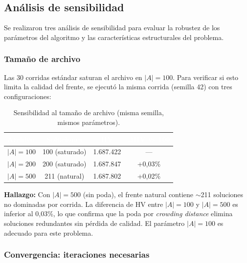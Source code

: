 \documentclass[12pt,letterpaper]{article}
\begin{document}
\subsection{Análisis de sensibilidad}

Se realizaron tres análisis de sensibilidad para evaluar la robustez de los parámetros del algoritmo y las características estructurales del problema.

\subsubsection{Tamaño de archivo}

Las 30 corridas estándar saturan el archivo en $|A| = 100$. Para verificar si esto limita la calidad del frente, se ejecutó la misma corrida (semilla 42) con tres configuraciones:

\begin{table}[H]
\centering
\caption{Sensibilidad al tamaño de archivo (misma semilla, mismos parámetros).}
\label{tab:archive_sens}
\renewcommand{\arraystretch}{1.4}
\begin{tabular}{lccc}
\toprule
\rowcolor{tablehead}
\textcolor{white}{\textbf{Archivo}} & \textcolor{white}{\textbf{Soluciones}} & \textcolor{white}{\textbf{HV}} & \textcolor{white}{\textbf{$\Delta$HV vs 100}} \\
\midrule
$|A| = 100$ & 100 (saturado) & 1.687.422 & --- \\
\rowcolor{gray!8}
$|A| = 200$ & 200 (saturado) & 1.687.847 & +0{,}03\% \\
$|A| = 500$ & 211 (natural) & 1.687.802 & +0{,}02\% \\
\bottomrule
\end{tabular}
\end{table}

\begin{answerbox}
\textbf{Hallazgo:} Con $|A| = 500$ (sin poda), el frente natural contiene $\sim$211 soluciones no dominadas por corrida. La diferencia de HV entre $|A| = 100$ y $|A| = 500$ es inferior al 0{,}03\%, lo que confirma que la poda por \textit{crowding distance} elimina soluciones redundantes sin pérdida de calidad. El parámetro $|A| = 100$ es adecuado para este problema.
\end{answerbox}

\subsubsection{Convergencia: iteraciones necesarias}
\end{document}
